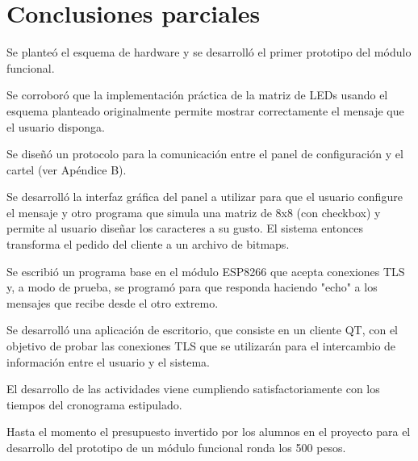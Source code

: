 \section{Conclusiones parciales}

Se planteó el esquema de hardware y se desarrolló el primer prototipo del módulo funcional.

Se corroboró que la implementación práctica de la matriz de LEDs usando el esquema planteado originalmente permite mostrar correctamente el mensaje que el usuario disponga.

Se diseñó un protocolo para la comunicación entre el panel de configuración y el cartel (ver Apéndice B).

Se desarrolló la interfaz gráfica del panel a utilizar para que el usuario configure el mensaje y otro programa que simula una matriz de 8x8 (con checkbox) y permite al usuario diseñar los caracteres a su gusto. El sistema entonces transforma el pedido del cliente a un archivo de bitmaps.

Se escribió un programa base en el módulo ESP8266 que acepta conexiones TLS y, a modo de prueba, se programó para que responda haciendo "echo" a los mensajes que recibe desde el otro extremo.

Se desarrolló una aplicación de escritorio, que consiste en un cliente QT, con el objetivo de probar las conexiones TLS que se utilizarán para el intercambio de información entre el usuario y el sistema.

El desarrollo de las actividades viene cumpliendo satisfactoriamente con los tiempos del cronograma estipulado.

Hasta el momento el presupuesto invertido por los alumnos en el proyecto para el desarrollo del prototipo de un módulo funcional ronda los 500 pesos.